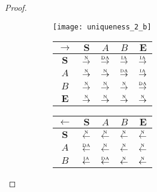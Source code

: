 \begin{proof}
\begin{figure}[htbp]
  \begin{subfigure}{1\textwidth}
    \vspace{1em}
    \centering
    \begin{minipage}[b]{1\textwidth}
      \centering
      \texttt{[image: uniqueness\_2\_b]}
    \end{minipage}
    \begin{minipage}[b]{0.3\textwidth}
      \vspace{1em}
      \centering
      \begin{tabular}{|c|c|c|c|c|} \hline
        $\rightarrow$ & $\bm{S}$ & $A$ & $B$ & $\bm{E}$\\ \hline
        $\bm{S}$ & $\overset{\text{\tiny{N}}}{\rightarrow}$ & $\overset{\text{\tiny{DA}}}{\rightarrow}$ & $\overset{\text{\tiny{IA}}}{\rightarrow}$ & $\overset{\text{\tiny{IA}}}{\rightarrow}$\\ \hline
        $A$ & $\overset{\text{\tiny{N}}}{\rightarrow}$ & $\overset{\text{\tiny{N}}}{\rightarrow}$ & $\overset{\text{\tiny{DA}}}{\rightarrow}$ & $\overset{\text{\tiny{IA}}}{\rightarrow}$\\ \hline
        $B$ & $\overset{\text{\tiny{N}}}{\rightarrow}$ & $\overset{\text{\tiny{N}}}{\rightarrow}$ & $\overset{\text{\tiny{N}}}{\rightarrow}$ & $\overset{\text{\tiny{DA}}}{\rightarrow}$\\ \hline
        $\bm{E}$ & $\overset{\text{\tiny{N}}}{\rightarrow}$ & $\overset{\text{\tiny{N}}}{\rightarrow}$ & $\overset{\text{\tiny{N}}}{\rightarrow}$ & $\overset{\text{\tiny{N}}}{\rightarrow}$\\ \hline
      \end{tabular}
    \end{minipage}
    \begin{minipage}[b]{0.3\textwidth}
      \vspace{1em}
      \centering
      \begin{tabular}{|c|c|c|c|c|} \hline
        $\leftarrow$ & $\bm{S}$ & $A$ & $B$ & $\bm{E}$\\ \hline
        $\bm{S}$ & $\overset{\text{\tiny{N}}}{\leftarrow}$ & $\overset{\text{\tiny{N}}}{\leftarrow}$ & $\overset{\text{\tiny{N}}}{\leftarrow}$ & $\overset{\text{\tiny{N}}}{\leftarrow}$\\ \hline
        $A$ & $\overset{\text{\tiny{DA}}}{\leftarrow}$ & $\overset{\text{\tiny{N}}}{\leftarrow}$ & $\overset{\text{\tiny{N}}}{\leftarrow}$ & $\overset{\text{\tiny{N}}}{\leftarrow}$\\ \hline
        $B$ & $\overset{\text{\tiny{IA}}}{\leftarrow}$ & $\overset{\text{\tiny{DA}}}{\leftarrow}$ & $\overset{\text{\tiny{N}}}{\leftarrow}$ & $\overset{\text{\tiny{N}}}{\leftarrow}$\\ \hline

\end{tabular}
\end{minipage}
\end{subfigure}
\end{figure}
\end{proof}
